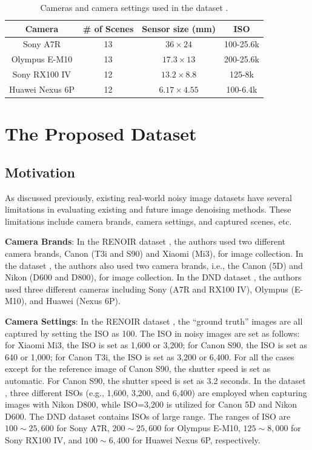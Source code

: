 \begin{table}[t!]
\caption{Cameras and camera settings used in the dataset \cite{dnd2017}.}

\label{tab6-3}
\begin{center}
\small
\renewcommand\arraystretch{1.2}
\begin{tabular*}{1\textwidth}{@{\extracolsep{\fill}}cccc}
\hline
Camera
&
\# of Scenes
&
Sensor size (mm)
&
ISO
\\
\hline
Sony A7R & 13  & $36\times24$  & 100-25.6k
\\
\hline
Olympus E-M10 & 13  & $17.3\times13$  & 200-25.6k 
\\
\hline   
Sony RX100 IV & 12 & $13.2\times8.8$  & 125-8k 
\\
\hline   
Huawei Nexus 6P & 12 & $6.17\times4.55$  & 100-6.4k 
\\
\hline
\end{tabular*}
\end{center}
\vspace{-4mm}
\end{table}


\section{The Proposed Dataset}

\subsection{Motivation}
As discussed previously, existing real-world noisy image datasets \cite{RENOIR2014,crosschannel2016,dnd2017} have several limitations in evaluating existing and future image denoising methods. These limitations include camera brands, camera settings, and captured scenes, etc.

\textbf{Camera Brands}: In the RENOIR dataset \cite{RENOIR2014}, the authors used two different camera brands, Canon (T3i and S90) and Xiaomi (Mi3), for image collection. In the dataset \cite{crosschannel2016}, the authors also used two camera brands, i.e., the Canon (5D) and Nikon (D600 and D800), for image collection. In the DND dataset \cite{dnd2017}, the authors used three different cameras including Sony (A7R and RX100 IV), Olympus (E-M10), and Huawei (Nexus 6P).

\textbf{Camera Settings}: In the RENOIR dataset \cite{RENOIR2014}, the ``ground truth'' images are all captured by setting the ISO as 100. The ISO in noisy images are set as follows: for Xiaomi Mi3, the ISO is set as 1,600 or 3,200; for Canon S90, the ISO is set as 640 or 1,000; for Canon T3i, the ISO is set as 3,200 or 6,400. For all the cases except for the reference image of Canon S90, the shutter speed is set as automatic. For Canon S90, the shutter speed is set as 3.2 seconds. In the dataset \cite{crosschannel2016}, three different ISOs (e.g., 1,600, 3,200, and 6,400) are employed when capturing images with Nikon D800, while ISO=3,200 is utilized for Canon 5D and Nikon D600. The DND dataset \cite{dnd2017} contains ISOs of large range. The ranges of ISO are $100\sim25,600$ for Sony A7R, $200\sim25,600$ for Olympus E-M10, $125\sim8,000$ for Sony RX100 IV, and $100\sim6,400$ for Huawei Nexus 6P, respectively. 

